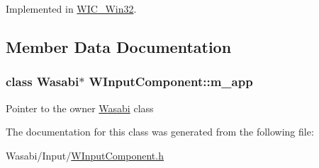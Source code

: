 Implemented in \hyperlink{class_w_i_c___win32_a56fd197d80d5740d567380e1656c4040}{W\+I\+C\+\_\+\+Win32}.



\subsection{Member Data Documentation}
\subsubsection[{\texorpdfstring{m\+\_\+app}{m_app}}]{\setlength{\rightskip}{0pt plus 5cm}class {\bf Wasabi}$\ast$ W\+Input\+Component\+::m\+\_\+app\hspace{0.3cm}{\ttfamily [protected]}}\hypertarget{class_w_input_component_a7ad5ee1c9e6397f4a13f5c674029441a}{}\label{class_w_input_component_a7ad5ee1c9e6397f4a13f5c674029441a}
Pointer to the owner \hyperlink{class_wasabi}{Wasabi} class 

The documentation for this class was generated from the following file\+:\begin{DoxyCompactItemize}
\item 
Wasabi/\+Input/\hyperlink{_w_input_component_8h}{W\+Input\+Component.\+h}\end{DoxyCompactItemize}
